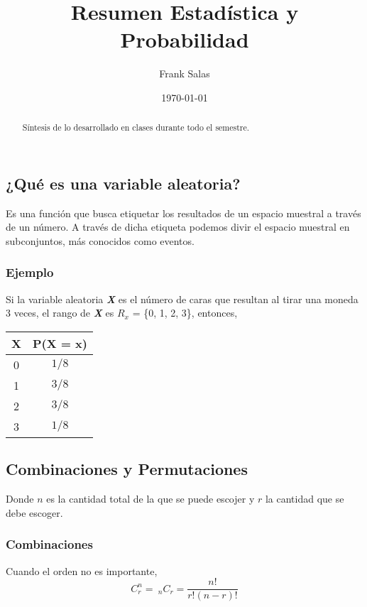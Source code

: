 \documentclass{article}
\title{Resumen Estadística y Probabilidad}
\author{Frank Salas}
\date{\today}
\begin{document}
\maketitle

\begin{abstract}
Síntesis de lo desarrollado en clases durante todo el semestre.
    
\end{abstract}

\subsection*{¿Qué es una variable aleatoria?}
Es una función que busca etiquetar los resultados de un espacio muestral a través de un número. A través de dicha etiqueta podemos divir el espacio muestral en subconjuntos, más conocidos como eventos.
\subsubsection*{Ejemplo}
Si la variable aleatoria \textit{\textbf{X}} es el número de caras que resultan al tirar una moneda 3 veces, el rango de \textit{\textbf{X}} es \textit{\textbf{$R_x$}} = \{0, 1, 2, 3\}, entonces,
\begin{center}
    \begin{tabular}{|c|c|}
        \hline
        \textbf{X} & \textbf{P(X = x)} \\
        \hline
        0 & $1/8$ \\
        \hline
        1 & $3/8$ \\
        \hline
        2 & $3/8$ \\
        \hline
        3 & $1/8$ \\
        \hline
    \end{tabular}
    
\end{center}

\subsection*{Combinaciones y Permutaciones}
Donde $n$ es la cantidad total de la que se puede escojer y $r$ la cantidad que se debe escoger. \\
\subsubsection*{Combinaciones}
Cuando el orden no es importante, \\
\[ C^{n}_{r}=\ _{n}C_{r}=\frac{n!}{r!(n-r)!} \]
\end{document}
